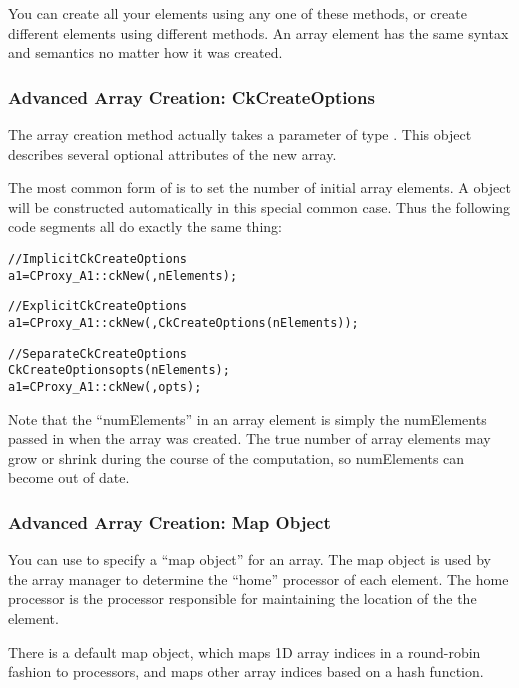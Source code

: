 You can create all your elements using any one of these methods,
or create different elements using different methods.  
An array element has the same syntax and semantics no matter
how it was created.


\subsubsection{Advanced Array Creation: CkCreateOptions}
\label{CkCreateOptions}

The array creation method  actually takes a parameter
of type .  This object describes several
optional attributes of the new array.

The most common form of  is to set the number
of initial array elements.  A  object will be 
constructed automatically in this special common case.  Thus
the following code segments all do exactly the same thing:

\begin{alltt}
//Implicit CkCreateOptions
  a1=CProxy_A1::ckNew(,nElements);

//Explicit CkCreateOptions
  a1=CProxy_A1::ckNew(,CkCreateOptions(nElements));

//Separate CkCreateOptions
  CkCreateOptions opts(nElements);
  a1=CProxy_A1::ckNew(,opts);
\end{alltt}

Note that the ``numElements'' in an array element is simply
the numElements passed in when the array was created.
The true number of array elements may grow or shrink during 
the course of the computation, so numElements can become 
out of date. 


\subsubsection{Advanced Array Creation: Map Object}
\label{array map}

You can use  to specify a ``map object''
for an array.  The map object is used by the array manager
to determine the ``home'' processor of each element.  The
home processor is the processor responsible for maintaining
the location of the the element.

There is a default map object, which maps 1D array indices
in a round-robin fashion to processors, and maps other array
indices based on a hash function.


